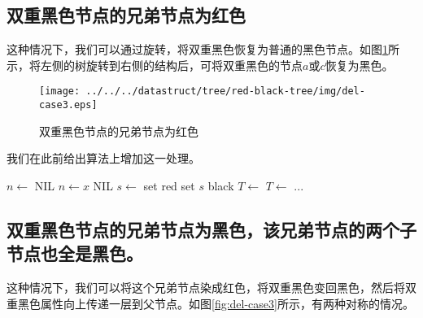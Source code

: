 \documentclass{ctexart}
\begin{document}
\subsection{双重黑色节点的兄弟节点为红色}
这种情况下，我们可以通过旋转，将双重黑色恢复为普通的黑色节点。如图\ref{fig:del-case2}所示，将左侧的树旋转到右侧的结构后，可将双重黑色的节点$a$或$c$恢复为黑色。

\begin{figure}[htbp]
  \centering
  \texttt{[image: ../../../datastruct/tree/red-black-tree/img/del-case3.eps]}
  \caption{双重黑色节点的兄弟节点为红色} \label{fig:del-case2}
\end{figure}

我们在此前给出算法上增加这一处理。

\begin{algorithmic}[1]
  \State $n \gets$ NIL
    
    \State $n \gets x$
  \EndIf
   
    \State \Return NIL
  \EndIf
     
        \State $s \gets$ 
         
          \State set  red
          \State set $s$ black
           
            \State $T \gets$ 
          \Else {}
            \State $T \gets$ 
          \EndIf
          \State ...
        \EndIf
    \EndIf
  \EndWhile
\EndFunction
\end{algorithmic}

\subsection{双重黑色节点的兄弟节点为黑色，该兄弟节点的两个子节点也全是黑色。}
这种情况下，我们可以将这个兄弟节点染成红色，将双重黑色变回黑色，然后将双重黑色属性向上传递一层到父节点。如图\ref{fig:del-case3}所示，有两种对称的情况。
\end{document}
